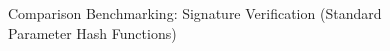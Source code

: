 \documentclass[]{final_report}
\begin{document}
\begin{figure}[H]
    \centering %
    
    \begin{minipage}{0.49\textwidth}
        \centering
       \caption{Comparison Benchmarking: Signature Verification (Standard Parameter Hash Functions)}
        \label{fig:image1}
    \end{minipage}
    \hfill %
    \begin{minipage}{0.49\textwidth}
        \centering

\end{minipage}
\end{figure}
\end{document}
